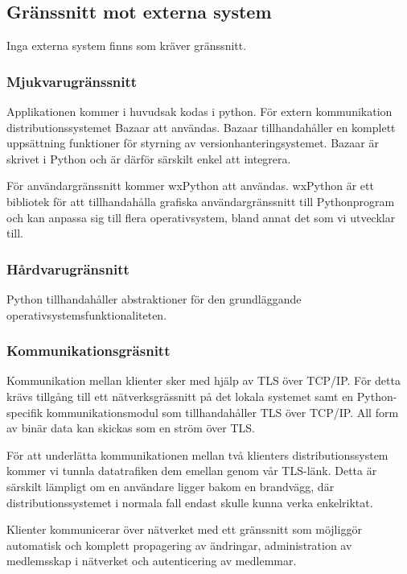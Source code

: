 \subsection{Gränssnitt mot externa system}
Inga externa system finns som kräver gränssnitt. 

\subsubsection{Mjukvarugränssnitt}
Applikationen kommer i huvudsak kodas i python. För extern kommunikation distributionssystemet Bazaar att användas. Bazaar tillhandahåller en komplett uppsättning funktioner för styrning av versionhanteringsystemet. Bazaar är skrivet i Python och är därför särskilt enkel att integrera.

För användargränssnitt kommer wxPython att användas. wxPython är ett bibliotek för att tillhandahålla grafiska användargränssnitt till Pythonprogram och kan anpassa sig till flera operativsystem, bland annat det som vi utvecklar till.

\subsubsection{Hårdvarugränsnitt}
Python tillhandahåller abstraktioner för den grundläggande operativsystemsfunktionaliteten.

\subsubsection{Kommunikationsgräsnitt}
Kommunikation mellan klienter sker med hjälp av TLS över TCP/IP. För detta krävs tillgång till ett nätverksgrässnitt på det lokala systemet samt en Python-specifik kommunikationsmodul som tillhandahåller TLS över TCP/IP. All form av binär data kan skickas som en ström över TLS.

För att underlätta kommunikationen mellan två klienters distributionssystem kommer vi tunnla datatrafiken dem emellan genom vår TLS-länk. Detta är särskilt lämpligt om en användare ligger bakom en brandvägg, där distributionssystemet i normala fall endast skulle kunna verka enkelriktat.

Klienter kommunicerar över nätverket med ett gränssnitt som möjliggör automatisk och komplett propagering av ändringar, administration av medlemsskap i nätverket och autenticering av medlemmar. 


